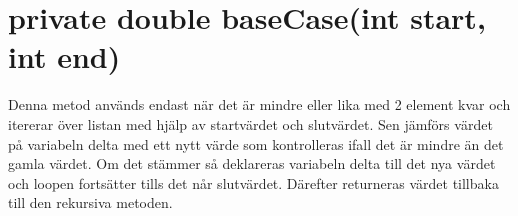 \documentclass[a5paper,10pt,oneside]{article}
\begin{document}
\section{private double baseCase(int start, int end)} 
Denna metod används endast när det är mindre eller lika med 2 element kvar  och itererar över listan med hjälp av startvärdet och slutvärdet. Sen jämförs värdet på variabeln delta med ett nytt värde som kontrolleras ifall det är mindre än det gamla värdet. Om det stämmer så deklareras variabeln delta till det nya värdet och loopen fortsätter tills det når slutvärdet.
Därefter returneras värdet tillbaka till den rekursiva metoden.
\end{document}
